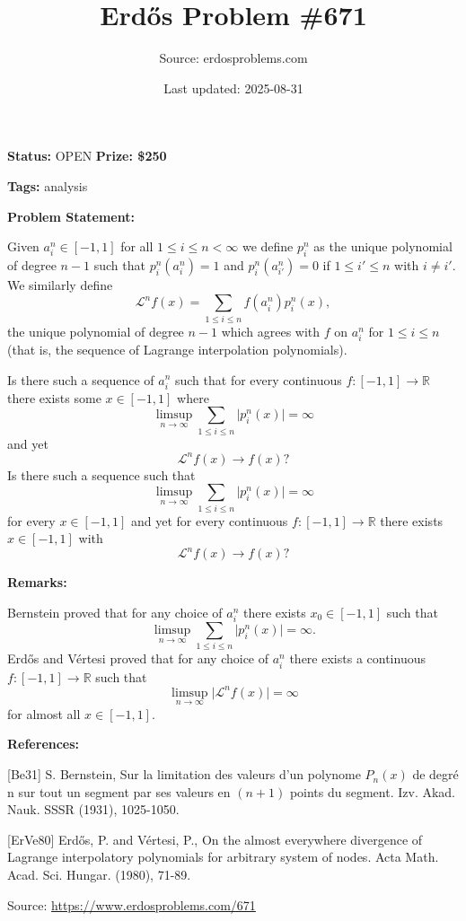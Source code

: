 \documentclass{article}
\title{Erd\H{o}s Problem \#671}
\date{Last updated: 2025-08-31}
\author{Source: erdosproblems.com}
\begin{document}
\maketitle

\noindent\textbf{Status:} OPEN \quad \textbf{Prize: \$250}

\noindent\textbf{Tags:} analysis

\medskip
\noindent\textbf{Problem Statement:}

Given $a_{i}^n\in [-1,1]$ for all $1\leq i\leq n<\infty$ we define $p_{i}^n$ as the unique polynomial of degree $n-1$ such that $p_{i}^n(a_{i}^n)=1$ and $p_{i}^n(a_{i'}^n)=0$ if $1\leq i'\leq n$ with $i\neq i'$. We similarly define\[\mathcal{L}^nf(x) = \sum_{1\leq i\leq n}f(a_i^n)p_i^n(x),\]the unique polynomial of degree $n-1$ which agrees with $f$ on $a_i^n$ for $1\leq i\leq n$ (that is, the sequence of Lagrange interpolation polynomials).

Is there such a sequence of $a_i^n$ such that for every continuous $f:[-1,1]\to \mathbb{R}$ there exists some $x\in [-1,1]$ where\[\limsup_{n\to \infty} \sum_{1\leq i\leq n}\lvert p_{i}^n(x)\rvert=\infty\]and yet\[\mathcal{L}^nf(x) \to f(x)?\]Is there such a sequence such that\[\limsup_{n\to \infty} \sum_{1\leq i\leq n}\lvert p_{i}^n(x)\rvert=\infty\]for every $x\in [-1,1]$ and yet for every continuous $f:[-1,1]\to \mathbb{R}$ there exists $x\in [-1,1]$ with\[\mathcal{L}^nf(x) \to f(x)?\]

\bigskip
\noindent\textbf{Remarks:}

Bernstein \cite{Be31} proved that for any choice of $a_i^n$ there exists $x_0\in [-1,1]$ such that\[\limsup_{n\to \infty} \sum_{1\leq i\leq n}\lvert p_{i}^n(x)\rvert=\infty.\]Erd\H{o}s and V\'{e}rtesi \cite{ErVe80} proved that for any choice of $a_i^n$ there exists a continuous $f:[-1,1]\to \mathbb{R}$ such that\[\limsup_{n\to \infty} \lvert \mathcal{L}^nf(x)\rvert=\infty\]for almost all $x\in [-1,1]$.

\bigskip
\noindent\textbf{References:}

[Be31] S. Bernstein, Sur la limitation des valeurs d'un polynome $P_n(x)$ de degr\'{e} n sur tout un segment par ses valeurs en $(n+1)$ points du segment. Izv. Akad. Nauk. SSSR (1931), 1025-1050.
 
 [ErVe80] Erd\H{o}s, P. and V\'{e}rtesi, P., On the almost everywhere divergence of Lagrange
interpolatory polynomials for arbitrary system of nodes. Acta Math. Acad. Sci. Hungar. (1980), 71-89.

\bigskip
\noindent\small{Source: \url{https://www.erdosproblems.com/671}}
\end{document}

